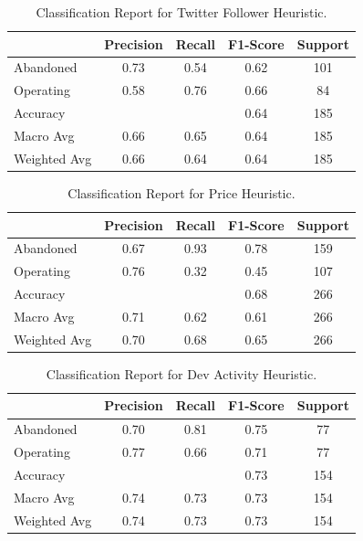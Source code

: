 \begin{table}[h!]
\centering
\begin{tabular}{lcccc}
\hline
    & Precision & Recall & F1-Score & Support \\
\hline
Abandoned & 0.73 & 0.54 & 0.62 & 101 \\
Operating & 0.58 & 0.76 & 0.66 & 84 \\
\hline
Accuracy & & & 0.64 & 185 \\
Macro Avg & 0.66 & 0.65 & 0.64 & 185 \\
Weighted Avg & 0.66 & 0.64 & 0.64 & 185 \\
\hline
\end{tabular}
\caption{Classification Report for Twitter Follower Heuristic.}
\end{table}

\begin{table}[h!]
    \centering
    \begin{tabular}{lcccc}
    \hline
        & Precision & Recall & F1-Score & Support \\
    \hline
    Abandoned & 0.67 & 0.93 & 0.78 & 159 \\
    Operating & 0.76 & 0.32 & 0.45 & 107 \\
    \hline
    Accuracy & & & 0.68 & 266 \\
    Macro Avg & 0.71 & 0.62 & 0.61 & 266 \\
    Weighted Avg & 0.70 & 0.68 & 0.65 & 266 \\
    \hline
    \end{tabular}
    \caption{Classification Report for Price Heuristic.}
\end{table}

\begin{table}[h!]
\centering
\begin{tabular}{lcccc}
\hline
    & Precision & Recall & F1-Score & Support \\
\hline
Abandoned & 0.70 & 0.81 & 0.75 & 77 \\
Operating & 0.77 & 0.66 & 0.71 & 77 \\
\hline
Accuracy & & & 0.73 & 154 \\
Macro Avg & 0.74 & 0.73 & 0.73 & 154 \\
Weighted Avg & 0.74 & 0.73 & 0.73 & 154 \\
\hline
\end{tabular}
\caption{Classification Report for Dev Activity Heuristic.}
\end{table}

